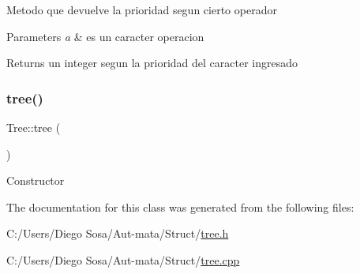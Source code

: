 Metodo que devuelve la prioridad segun cierto operador 
\begin{DoxyParams}{Parameters}
{\em a} & es un caracter operacion \\
\hline
\end{DoxyParams}
\begin{DoxyReturn}{Returns}
un integer segun la prioridad del caracter ingresado 
\end{DoxyReturn}
\hypertarget{class_tree_a7bebcbdd3651d31b2adeb82e8817a720}{}\label{class_tree_a7bebcbdd3651d31b2adeb82e8817a720} 
\subsubsection{\texorpdfstring{tree()}{tree()}}
{\footnotesize\ttfamily Tree\+::tree (\begin{DoxyParamCaption}{ }\end{DoxyParamCaption})}

Constructor 

The documentation for this class was generated from the following files\+:\begin{DoxyCompactItemize}
\item 
C\+:/\+Users/\+Diego Sosa/\+Aut-\/mata/\+Struct/\hyperlink{tree_8h}{tree.\+h}\item 
C\+:/\+Users/\+Diego Sosa/\+Aut-\/mata/\+Struct/\hyperlink{tree_8cpp}{tree.\+cpp}\end{DoxyCompactItemize}
